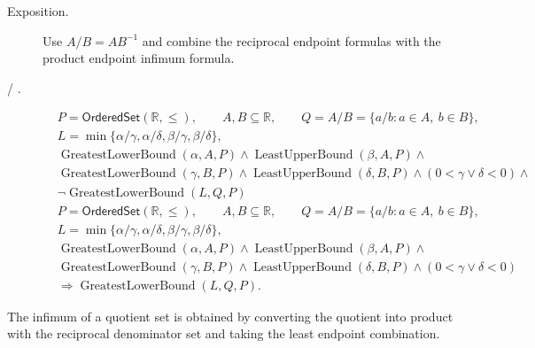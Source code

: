\begin{remark*}
\begin{description}
  \item[Exposition.]
Use $A/B=A B^{-1}$ and combine the reciprocal endpoint formulas with the
product endpoint infimum formula.


  \item[ / .]

\[
\begin{aligned}
&P=\mathsf{OrderedSet}(\mathbb{R},\leq),\qquad
A,B\subseteq\mathbb{R},\qquad Q=A/B=\{a/b:a\in A,\ b\in B\},\\
&L=\min\{\alpha/\gamma,\alpha/\delta,\beta/\gamma,\beta/\delta\},\\
&\operatorname{GreatestLowerBound}(\alpha,A,P)\land
\operatorname{LeastUpperBound}(\beta,A,P)\land\\
&\operatorname{GreatestLowerBound}(\gamma,B,P)\land
\operatorname{LeastUpperBound}(\delta,B,P)\land
(0<\gamma\lor\delta<0)\land\\
&\neg\operatorname{GreatestLowerBound}(L,Q,P)
\end{aligned}
\]
\[
\begin{aligned}
&P=\mathsf{OrderedSet}(\mathbb{R},\leq),\qquad
A,B\subseteq\mathbb{R},\qquad Q=A/B=\{a/b:a\in A,\ b\in B\},\\
&L=\min\{\alpha/\gamma,\alpha/\delta,\beta/\gamma,\beta/\delta\},\\
&\operatorname{GreatestLowerBound}(\alpha,A,P)\land
\operatorname{LeastUpperBound}(\beta,A,P)\land\\
&\operatorname{GreatestLowerBound}(\gamma,B,P)\land
\operatorname{LeastUpperBound}(\delta,B,P)\land
(0<\gamma\lor\delta<0)\\
&\Longrightarrow \operatorname{GreatestLowerBound}(L,Q,P).
\end{aligned}
\]
\end{description}
\end{remark*}

\begin{remark*}[Interpretation]
The infimum of a quotient set is obtained by converting the quotient into
product with the reciprocal denominator set and taking the least endpoint
combination.
\end{remark*}

